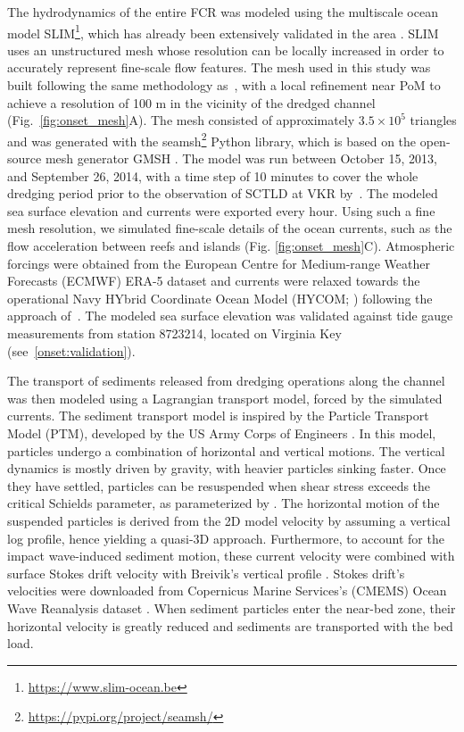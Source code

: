 \documentclass[preprint,12pt,authoryear]{elsarticle}
\begin{document}
The hydrodynamics of the entire FCR was modeled using the multiscale ocean model SLIM\footnote{\url{ https://www.slim-ocean.be}}, which has already been extensively validated in the area \citep{frys2020fine,dobbelaere2020coupled,dobbelaere2022impacts,dobbelaere2022connecting}. SLIM uses an unstructured mesh whose resolution can be locally increased in order to accurately represent fine-scale flow features. The mesh used in this study was built following the same methodology as~\cite{dobbelaere2020coupled}, with a local refinement near PoM to achieve a resolution of 100 m in the vicinity of the dredged channel (Fig.~\ref{fig:onset_mesh}A). The mesh consisted of approximately $3.5\times 10^5$ triangles and was generated with the seamsh\footnote{\url{https://pypi.org/project/seamsh/}} Python library, which is based on the open-source mesh generator GMSH \citep{geuzaine2009gmsh}. The model was run between October 15, 2013, and September 26, 2014, with a time step of 10 minutes to cover the whole dredging period prior to the observation of SCTLD at VKR by~\cite{precht2016unprecedented}. The modeled sea surface elevation and currents were exported every hour. Using such a fine mesh resolution, we simulated fine-scale details of the ocean currents, such as the flow acceleration between reefs and islands (Fig. \ref{fig:onset_mesh}C). Atmospheric forcings were obtained from the European Centre for Medium-range Weather Forecasts (ECMWF) ERA-5 dataset and currents were relaxed towards the operational Navy HYbrid Coordinate Ocean Model (HYCOM; \citealp{chassignet2007hycom}) following the approach of~\cite{dobbelaere2022impacts}. The modeled sea surface elevation was validated against tide gauge measurements from station 8723214, located on Virginia Key (see~\ref{onset:validation}).

The transport of sediments released from dredging operations along the channel was then modeled using a Lagrangian transport model, forced by the simulated currents. The sediment transport model is inspired by the Particle Transport Model (PTM), developed by the US Army Corps of Engineers \citep{macdonald2006ptm}. In this model, particles undergo a combination of horizontal and vertical motions. The vertical dynamics is mostly driven by gravity, with heavier particles sinking faster. Once they have settled, particles can be resuspended when shear stress exceeds   the critical Schields parameter, as parameterized by \cite{soulsby1997threshold}. The horizontal motion of the suspended particles is derived from the 2D model velocity by assuming a vertical log profile, hence yielding a quasi-3D approach. Furthermore, to account for the impact wave-induced sediment motion, these current velocity were combined with surface Stokes drift velocity with Breivik's vertical profile \citep{breivik2016stokes}. Stokes drift's velocities were downloaded from Copernicus Marine Services's (CMEMS) Ocean Wave Reanalysis dataset \citep{cmems}. When sediment particles enter the near-bed zone, their horizontal velocity is greatly reduced and sediments are transported with the bed load.
\end{document}
